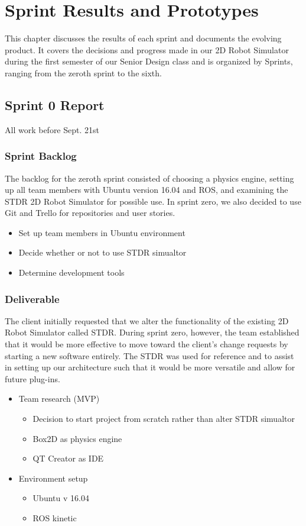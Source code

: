 

\chapter{Sprint Results and Prototypes}

This chapter discusses the results of each sprint and documents the evolving product. It covers the decisions and progress made in our 2D Robot Simulator during the first semester of our Senior Design class and is organized by Sprints, ranging from the zeroth sprint to the sixth.    

\section{Sprint 0 Report}
All work before Sept. 21st
\subsection{Sprint Backlog}

The backlog for the zeroth sprint consisted of choosing a physics engine, setting up all team members with Ubuntu version 16.04 and ROS, and examining the STDR 2D Robot Simulator for possible use. In sprint zero, we also decided to use Git and Trello for repositories and user stories.

\begin{itemize}
	\item Set up team members in Ubuntu environment
	\item Decide whether or not to use STDR simualtor
	\item Determine development tools 
\end{itemize}

\subsection{Deliverable}

The client initially requested that we alter the functionality of the existing 2D Robot Simulator called STDR. During sprint zero, however, the team established that it would be more effective to move toward the client's change requests by starting a new software entirely. The STDR was used for reference and to assist in setting up our architecture such that it would be more versatile and allow for future plug-ins.

\begin{itemize}
	\item Team research (MVP)
	\begin{itemize}
		\item Decision to start project from scratch rather than alter STDR simualtor
		\item Box2D as physics engine
		\item QT Creator as IDE
	\end{itemize}
	\item Environment setup
	\begin{itemize}
		\item Ubuntu v 16.04 
		\item ROS kinetic
	\end{itemize}
\end{itemize}


